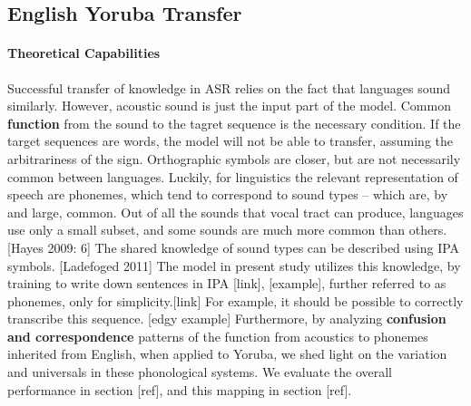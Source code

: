 \documentclass[11pt]{article}
\begin{document}
\subsection{English Yoruba Transfer}
\paragraph{Theoretical Capabilities} Successful transfer of knowledge in ASR relies on the fact that languages sound similarly. However, acoustic sound is just the input part of the model. Common \textbf{function} from the sound to the tagret sequence is the necessary condition. If the target sequences are words, the model will not be able to transfer, assuming the arbitrariness of the sign. Orthographic symbols are closer, but are not necessarily common between languages. Luckily, for linguistics the relevant representation of speech are phonemes, which tend to correspond to sound types -- which are, by and large, common. Out of all the sounds that vocal tract can produce, languages use only a small subset, and some sounds are much more common than others. [Hayes 2009: 6] The shared knowledge of sound types can be described using IPA symbols. [Ladefoged 2011] The model in present study utilizes this knowledge, by training to write down sentences in IPA [link], [example], further referred to as phonemes, only for simplicity.[link] For example, it should be possible to correctly transcribe this sequence. [edgy example]  Furthermore, by analyzing \textbf{confusion and correspondence} patterns of the function from acoustics to phonemes inherited from English, when applied to Yoruba, we shed light on the variation and universals in these phonological systems. We evaluate the overall performance in section [ref], and this mapping in section [ref].
\end{document}
